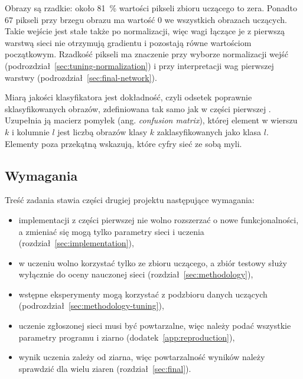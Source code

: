 Obrazy są rzadkie: około \qty{81}{\percent} wartości pikseli zbioru uczącego to zera. Ponadto $67$ pikseli przy brzegu obrazu ma wartość $0$ we wszystkich obrazach uczących. Takie wejście jest stałe także po normalizacji, więc wagi łączące je z pierwszą warstwą sieci nie otrzymują gradientu i pozostają równe wartościom początkowym. Rzadkość pikseli ma znaczenie przy wyborze normalizacji wejść (podrozdział~\ref{sec:tuning-normalization}) i przy interpretacji wag pierwszej warstwy (podrozdział~\ref{sec:final-network}).

Miarą jakości klasyfikatora jest dokładność, czyli odsetek poprawnie sklasyfikowanych obrazów, zdefiniowana tak samo jak w części pierwszej \cite[rozdz.~2.1]{gracikowski2026}. Uzupełnia ją macierz pomyłek (ang. \textit{confusion matrix}), której element w wierszu $k$ i kolumnie $l$ jest liczbą obrazów klasy $k$ zaklasyfikowanych jako klasa $l$. Elementy poza przekątną wskazują, które cyfry sieć ze sobą myli.

\subsection{Wymagania}
\label{sec:problem-requirements}

Treść zadania stawia części drugiej projektu następujące wymagania:
\begin{itemize}
    \item implementacji z części pierwszej nie wolno rozszerzać o nowe funkcjonalności, a zmieniać się mogą tylko parametry sieci i uczenia (rozdział~\ref{sec:implementation}),
    \item w uczeniu wolno korzystać tylko ze zbioru uczącego, a zbiór testowy służy wyłącznie do oceny nauczonej sieci (rozdział~\ref{sec:methodology}),
    \item wstępne eksperymenty mogą korzystać z podzbioru danych uczących (podrozdział~\ref{sec:methodology-tuning}),
    \item uczenie zgłoszonej sieci musi być powtarzalne, więc należy podać wszystkie parametry programu i ziarno (dodatek~\ref{app:reproduction}),
    \item wynik uczenia zależy od ziarna, więc powtarzalność wyników należy sprawdzić dla wielu ziaren (rozdział~\ref{sec:final}).
\end{itemize}
